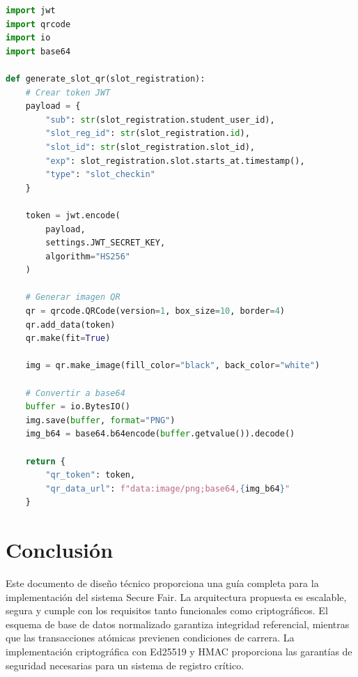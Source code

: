 \documentclass[12pt,a4paper]{article}
\begin{document}
\begin{lstlisting}[language=Python]
import jwt
import qrcode
import io
import base64

def generate_slot_qr(slot_registration):
    # Crear token JWT
    payload = {
        "sub": str(slot_registration.student_user_id),
        "slot_reg_id": str(slot_registration.id),
        "slot_id": str(slot_registration.slot_id),
        "exp": slot_registration.slot.starts_at.timestamp(),
        "type": "slot_checkin"
    }
    
    token = jwt.encode(
        payload,
        settings.JWT_SECRET_KEY,
        algorithm="HS256"
    )
    
    # Generar imagen QR
    qr = qrcode.QRCode(version=1, box_size=10, border=4)
    qr.add_data(token)
    qr.make(fit=True)
    
    img = qr.make_image(fill_color="black", back_color="white")
    
    # Convertir a base64
    buffer = io.BytesIO()
    img.save(buffer, format="PNG")
    img_b64 = base64.b64encode(buffer.getvalue()).decode()
    
    return {
        "qr_token": token,
        "qr_data_url": f"data:image/png;base64,{img_b64}"
    }
\end{lstlisting}

\section{Conclusión}

Este documento de diseño técnico proporciona una guía completa para la implementación del sistema Secure Fair. La arquitectura propuesta es escalable, segura y cumple con los requisitos tanto funcionales como criptográficos. El esquema de base de datos normalizado garantiza integridad referencial, mientras que las transacciones atómicas previenen condiciones de carrera. La implementación criptográfica con Ed25519 y HMAC proporciona las garantías de seguridad necesarias para un sistema de registro crítico.
\end{document}
